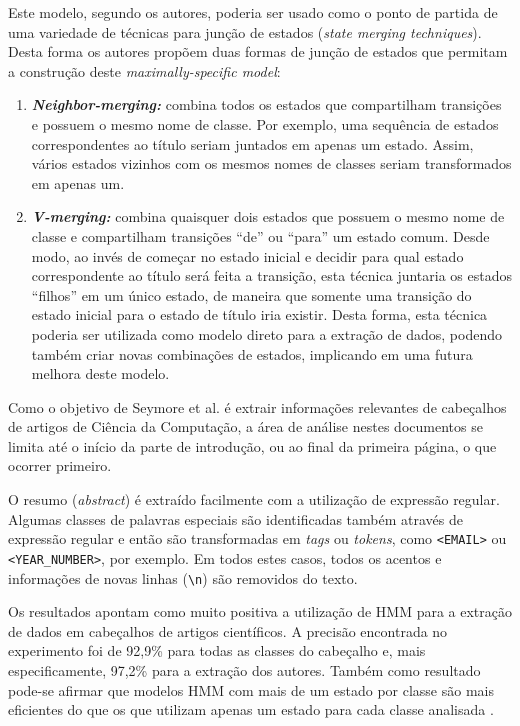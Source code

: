 Este modelo, segundo os autores, poderia ser usado como o ponto de partida de uma variedade de técnicas para junção de estados (\textit{state merging techniques}). Desta forma os autores propõem duas formas de junção de estados que permitam a construção deste \textit{maximally-specific model}:

\begin{enumerate}

\item \textit{\textbf{Neighbor-merging:}} combina todos os estados que compartilham transições e possuem o mesmo nome de classe. Por exemplo, uma sequência de estados correspondentes ao título seriam juntados em apenas um estado. Assim, vários estados vizinhos com os mesmos nomes de classes seriam transformados em apenas um.

\item \textit{\textbf{V-merging:}} combina quaisquer dois estados que possuem o mesmo nome de classe e compartilham transições ``de'' ou ``para'' um estado comum. Desde modo, ao invés de começar no estado inicial e decidir para qual estado correspondente ao título será feita a transição, esta técnica juntaria os estados ``filhos'' em um único estado, de maneira que somente uma transição do estado inicial para o estado de título iria existir. Desta forma, esta técnica poderia ser utilizada como modelo direto para a extração de dados, podendo também criar novas combinações de estados, implicando em uma futura melhora deste modelo.

\end{enumerate}

Como o objetivo de Seymore et al. é extrair informações relevantes de cabeçalhos de artigos de Ciência da Computação, a área de análise nestes documentos se limita até o início da parte de introdução, ou ao final da primeira página, o que ocorrer primeiro.

O resumo (\textit{abstract}) é extraído facilmente com a utilização de expressão regular. Algumas classes de palavras especiais são identificadas também através de expressão regular e então são transformadas em \textit{tags} ou \textit{tokens}, como \texttt{<EMAIL>} ou \texttt{<YEAR\_NUMBER>}, por exemplo. Em todos estes casos, todos os acentos e informações de novas linhas (\texttt{\textbackslash{n}}) são removidos do texto.

Os resultados apontam como muito positiva a utilização de HMM para a extração de dados em cabeçalhos de artigos científicos. A precisão encontrada no experimento foi de 92,9\% para todas as classes do cabeçalho e, mais especificamente, 97,2\% para a extração dos autores. Também como resultado pode-se afirmar que modelos HMM com mais de um estado por classe são mais eficientes do que os que utilizam apenas um estado para cada classe analisada \cite{Seymore-HMM-IE}.

